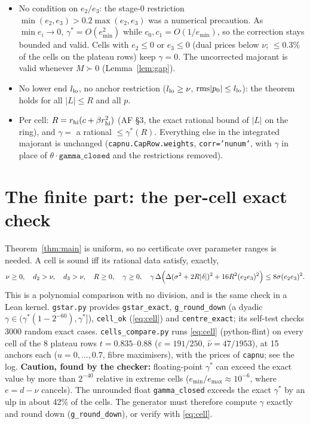 \documentclass[11pt]{article}
\theoremstyle{remark}
\begin{document}
\begin{itemize}
\item No condition on $e_2/e_3$: the stage-0 restriction $\min(e_2,e_3)>0.2\max(e_2,e_3)$ was a numerical precaution. As
$\min e_i\to0$, $\gamma^*=O(e_{\min}^2)$ while $c_0,c_1=O(1/e_{\min})$, so the correction stays bounded and valid. Cells with
$e_2\le0$ or $e_3\le0$ (dual prices below $\nu$; $\le0.3\%$ of the cells on the plateau rows) keep $\gamma=0$. The uncorrected
majorant is valid whenever $M\succ0$ (Lemma~\ref{lem:gap}).
\item No lower end $l_{\rm lo}$, no anchor restriction ($l_{\rm lo}\ge\nu$, $\mathrm{rms}|p_0|\le l_{\rm lo}$): the theorem holds
for all $|L|\le R$ and all $p$.
\item Per cell: $R=r_{\rm hi}(c+\beta r_{\rm hi}^2)$ (AF \S3, the exact rational bound of $|L|$ on the ring), and
$\gamma=$ a rational $\le\gamma^*(R)$. Everything else in the integrated majorant is unchanged (\texttt{capnu.CapRow.weights},
\texttt{corr='nunum'}, with $\gamma$ in place of $\theta\cdot\texttt{gamma\_closed}$ and the restrictions removed).
\end{itemize}

\section{The finite part: the per-cell exact check}

Theorem~\ref{thm:main} is uniform, so no certificate over parameter ranges is needed. A cell is sound iff its rational data
satisfy, exactly,
\begin{equation}\label{eq:cell}
\nu\ge0,\quad d_2>\nu,\quad d_3>\nu,\quad R\ge0,\quad \gamma\ge0,\quad
\gamma\,\Delta\Bigl(\Delta(\sigma^2+2R|\delta|)^2+16R^2(e_2e_3)^2\Bigr)\le8\sigma(e_2e_3)^2 .
\end{equation}
This is a polynomial comparison with no division, and is the same check in a Lean kernel. \texttt{gstar.py} provides
\texttt{gstar\_exact}, \texttt{g\_round\_down} (a dyadic $\gamma\in(\gamma^*(1-2^{-60}),\gamma^*]$), \texttt{cell\_ok}
(\eqref{eq:cell}) and \texttt{centre\_exact}; its self-test checks 3000 random exact cases. \texttt{cells\_compare.py} runs
\eqref{eq:cell} (python-flint) on every cell of the 8 plateau rows $t=0.835$--$0.88$ ($\varepsilon=191/250$,
$\hat\nu=47/1953$), at 15 anchors each ($u=0,\dots,0.7$, fibre maximisers), with the prices of \texttt{capnu}; see the log.
\textbf{Caution, found by the checker:} floating-point $\gamma^*$ can exceed the exact value by more than $2^{-40}$ relative in
extreme cells ($e_{\min}/e_{\max}\approx10^{-6}$, where $e=d-\nu$ cancels). The unrounded float \texttt{gamma\_closed} exceeds
the exact $\gamma^*$ by an ulp in about 42\% of the cells. The generator must therefore compute $\gamma$ exactly and round down
(\texttt{g\_round\_down}), or verify with \eqref{eq:cell}.
\end{document}

